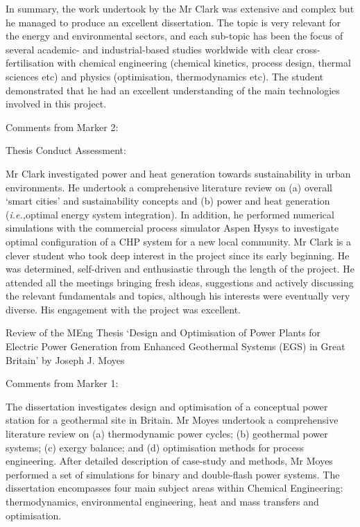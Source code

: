 \documentclass[14pt,twoside]{report}
\newcommand{\ie}{{\it i.e.,}}
\begin{document}
In summary, the work undertook by the Mr Clark was extensive and complex but he managed to produce an excellent dissertation. The topic is very relevant for the energy and environmental sectors, and each sub-topic has been the focus of several academic- and industrial-based studies worldwide with clear cross-fertilisation with chemical engineering (chemical kinetics, process design, thermal sciences etc) and physics (optimisation, thermodynamics etc). The student demonstrated that he had an excellent understanding of the main technologies involved in this project.

\bigskip

\noindent
    {\Large Comments from Marker 2:}

\noindent

\clearpage

{\Large Thesis Conduct Assessment:}

\noindent
Mr Clark investigated power and heat generation towards sustainability in urban environments. He undertook a comprehensive literature review on (a) overall `smart cities' and sustainability concepts and (b) power and heat generation (\ie optimal energy system integration). In addition, he performed numerical simulations with the commercial process simulator Aspen Hysys to investigate optimal configuration of a CHP system for a new local community. Mr Clark is a clever student who took deep interest in the project since its early beginning. He was determined, self-driven and enthusiastic through the length of the project. He attended all the meetings bringing fresh ideas, suggestions and actively discussing the relevant fundamentals and topics, although his interests were eventually very diverse. His engagement with the project was excellent. 

\clearpage




\bigskip

\begin{center}
  {\Large Review of the MEng Thesis `Design and Optimisation of Power Plants for Electric Power Generation from Enhanced Geothermal Systems (EGS) in Great Britain' by Joseph J. Moyes}
\end{center}

\noindent
    {\Large Comments from Marker 1:}

The dissertation investigates design and optimisation of a conceptual power station for a geothermal site in Britain. Mr Moyes undertook a comprehensive literature review on (a) thermodynamic power cycles; (b) geothermal power systems; (c) exergy balance; and (d) optimisation methods for process engineering. After detailed description of case-study and methods, Mr Moyes performed a set of simulations for binary and double-flash power systems. The dissertation encompasses four main subject areas within Chemical Engineering: thermodynamics, environmental engineering, heat and mass transfers and optimisation. 
\end{document}
